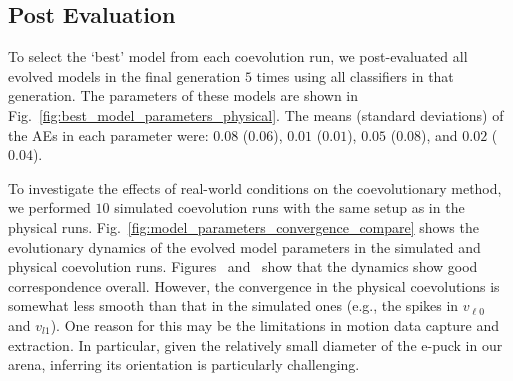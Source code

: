 \subsection{Post Evaluation}
 To select the `best' model from each coevolution run, we post-evaluated all evolved models in the final generation $5$ times using all classifiers in that generation. The parameters of these models are shown in Fig.~\ref{fig:best_model_parameters_physical}. The means (standard deviations) of the AEs in each parameter were: $0.08$ ($0.06$), $0.01$ ($0.01$), $0.05$ ($0.08$), and $0.02$ ($0.04$).

To investigate the effects of real-world conditions on the coevolutionary method, we performed $10$ simulated coevolution runs with the same setup as in the physical runs.
Fig.~\ref{fig:model_parameters_convergence_compare} shows the evolutionary dynamics of the evolved model parameters in the simulated and physical coevolution runs.
Figures~  and~ show that the dynamics show good correspondence overall. However, the convergence in the physical coevolutions is somewhat less smooth than that in the simulated ones (e.g., the spikes in $v_{\ell0}$ and $v_{l1}$). One reason for this may be the limitations in motion data capture and extraction. In particular, given the relatively small diameter of the e-puck in our arena, inferring its orientation is particularly challenging.

